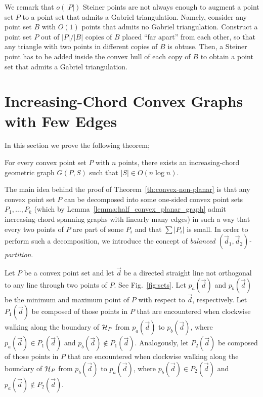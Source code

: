 \documentclass{llncs}
\begin{document}
We remark that $o(|P|)$ Steiner points are not always enough to augment a point set $P$ to a point set that admits a Gabriel triangulation. Namely, consider any point set $B$ with $O(1)$ points that admits no Gabriel triangulation. Construct a point set $P$ out of $|P|/|B|$ copies of $B$ placed ``far apart'' from each other, so that any triangle with two points in different copies of $B$ is obtuse. Then, a Steiner point has to be added inside the convex hull of each copy of $B$ to obtain a point set that admits a Gabriel triangulation.


\section{Increasing-Chord Convex Graphs with Few Edges}

In this section we prove the following theorem;

\begin{theorem} \label{th:convex-non-planar}
For every convex point set $P$ with $n$ points, there exists an increasing-chord geometric graph $G(P,S)$ such that $|S|\in O(n \log n)$.
\end{theorem}

The main idea behind the proof of Theorem~\ref{th:convex-non-planar} is that any convex point set $P$ can be decomposed into some one-sided convex point sets $P_1,\dots,P_k$ (which by Lemma~\ref{lemma:half_convex_planar_graph} admit increasing-chord spanning graphs with linearly many edges) in such a way that every two points of $P$ are part of some $P_i$ and that $\sum |P_i|$ is small. In order to perform such a decomposition, we introduce the concept of {\em balanced $({\vec d}_1,{\vec d}_2)$-partition}.

Let $P$ be a convex point set and let $\vec d$ be a directed straight line not orthogonal to any line through two points of $P$. See Fig.~\ref{fig:sets}. Let $p_a({\vec d})$ and $p_b({\vec d})$ be the minimum and maximum point of $P$ with respect to ${\vec d}$, respectively. Let $P_1({\vec d})$ be composed of those points in $P$ that are encountered when clockwise walking along the boundary of ${\cal H}_P$ from $p_a({\vec d})$ to $p_b({\vec d})$, where $p_a({\vec d})\in P_1({\vec d})$ and $p_b({\vec d})\notin P_1({\vec d})$. Analogously, let $P_2({\vec d})$ be composed of those points in $P$ that are encountered when clockwise walking along the boundary of ${\cal H}_P$ from $p_b({\vec d})$ to $p_a({\vec d})$, where $p_b({\vec d})\in P_2({\vec d})$ and $p_a({\vec d})\notin P_2({\vec d})$.
\end{document}
